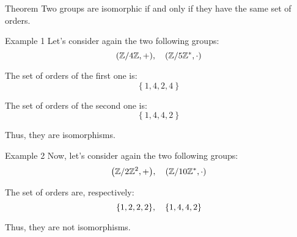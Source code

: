 \documentclass[a4paper]{article}
\begin{document}
\begin{parag}{Theorem}
    Two groups are isomorphic if and only if they have the same set of orders.
\end{parag}

\begin{parag}{Example 1}
    Let's consider again the two following groups:
    \[\left(\mathbb{Z}/4\mathbb{Z}, +\right), \mathspace \left(\mathbb{Z} / 5\mathbb{Z}^*, \cdot\right)\]

    The set of orders of the first one is: 
    \[\left\{1, 4, 2, 4\right\}\]
    
    The set of orders of the second one is: 
    \[\left\{1, 4, 4, 2\right\}\]

    Thus, they are isomorphisms.
\end{parag}

\begin{parag}{Example 2}
    Now, let's consider again the two following groups: 
    \[\left(\mathbb{Z} / 2\mathbb{Z}^2, +\right), \mathspace \left(\mathbb{Z} / 10\mathbb{Z}^*, \cdot\right)\]
    
    The set of orders are, respectively: 
    \[\left\{1, 2, 2, 2\right\}, \mathspace \left\{1, 4, 4, 2\right\}\]
    
    Thus, they are not isomorphisms.
\end{parag}
\end{document}
